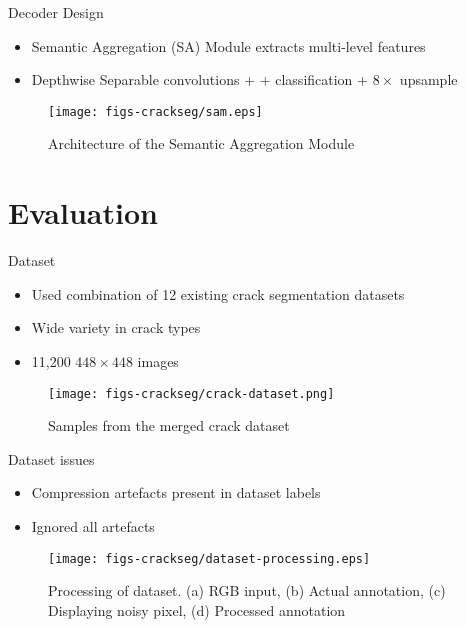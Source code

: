 \documentclass{libs/curtin_format}
\begin{document}
\begin{frame}{Decoder Design}
\begin{itemize}
        \item Semantic Aggregation (SA) Module extracts multi-level features
        \item Depthwise Separable convolutions + + classification + $8 \times$ upsample
    \end{itemize}
   \begin{figure}
        \centering        
        \texttt{[image: figs-crackseg/sam.eps]}
        \caption{Architecture of the Semantic Aggregation Module}
        \label{fig:pipeline}
    \end{figure}
\end{frame}



\section{Evaluation}
\begin{frame}{Dataset}
\begin{itemize}
        \item Used combination of 12 existing crack segmentation datasets
        \item Wide variety in crack types
        \item 11,200 $448 \times 448$ images
    \end{itemize}
   \begin{figure}
        \centering        
        \texttt{[image: figs-crackseg/crack-dataset.png]}
        \caption{Samples from the merged crack dataset}
        \label{Fig:annotation}
    \end{figure}
\end{frame}

\begin{frame}{Dataset issues}
\begin{itemize}
        \item Compression artefacts present in dataset labels
        \item Ignored all artefacts
    \end{itemize}
   \begin{figure}
        \centering        
        \texttt{[image: figs-crackseg/dataset-processing.eps]}
        \caption{Processing of dataset. (a) RGB input, (b) Actual annotation, (c) Displaying noisy pixel, (d) Processed annotation}
        \label{Fig:annotation}
    \end{figure}
\end{frame}
\end{document}
